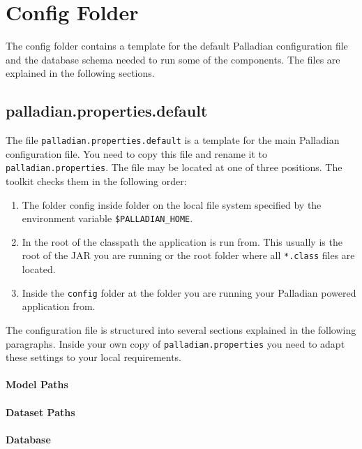 \section{Config Folder}
\label{sec:config.conf}
The config folder contains a template for the default Palladian configuration file and the database schema needed to run some of the components. The files are explained in the following sections.

\subsection{palladian.properties.default}
\label{sec:palladian.properties.default}
The file \texttt{palladian.properties.default} is a template for the main Palladian configuration file. You need to copy this file and rename it to \texttt{palladian.properties}. The file may be located at one of three positions. The toolkit checks them in the following order:
\begin{enumerate}
\item The folder config inside folder on the local file system specified by the environment variable \texttt{\$PALLADIAN\_HOME}.
\item In the root of the classpath the application is run from. This usually is the root of the JAR you are running or the root folder where all \texttt{*.class} files are located.
\item Inside the \texttt{config} folder at the folder you are running your Palladian powered application from.
\end{enumerate}

The configuration file is structured into several sections explained in the following paragraphs. Inside your own copy of \texttt{palladian.properties} you need to adapt these settings to your local requirements.

\paragraph{Model Paths}
\label{par:modelpaths}

\paragraph{Dataset Paths}
\label{par:datasetpaths}

\paragraph{Database}
\label{par:database}

